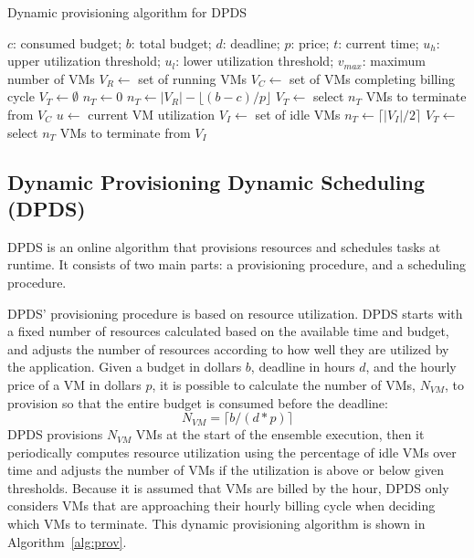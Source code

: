 \documentclass[preprint,5p]{elsarticle}
\begin{document}
\begin{algorithm}[tb]
\caption{Dynamic provisioning algorithm for DPDS}
\label{alg:prov}
{\footnotesize
\begin{algorithmic}[1]
\Require $c$: consumed budget; $b$: total budget; $d$: deadline; $p$: price;
$t$: current time; $u_h$: upper utilization threshold; $u_l$: lower utilization
threshold; $v_{max}$: maximum number of VMs
  \State $V_R\gets$ set of running VMs
    \State $V_C\gets$ set of VMs completing billing cycle
    \State $V_T\gets \emptyset$ 
    \State $n_T\gets 0$ 
      \State $n_T\gets |V_R| - \lfloor(b-c)/p\rfloor$
      \State $V_T\gets$ select $n_T$ VMs to terminate from $V_C$
      \State {} \label{l:terminate1}
    \Else 
    \State $u\gets$ current VM utilization
        \State {}
        \State $V_I\gets$ set of idle VMs
        \State $n_T\gets \lceil|V_I|/2\rceil$ \label{l:nT2}
      \State $V_T\gets$ select $n_T$ VMs to terminate from $V_I$
        \State {} \label{l:terminate2}
      \EndIf 
    \EndIf
\EndProcedure
\end{algorithmic}}
\end{algorithm}

\subsection{Dynamic Provisioning Dynamic Scheduling (DPDS)}
\label{sec:dpds}

DPDS is an online algorithm that provisions resources and schedules tasks at
runtime. It consists of two main parts: a provisioning procedure, and a
scheduling procedure.

DPDS' provisioning procedure is based on resource utilization. DPDS starts with
a fixed number of resources calculated based on the available time and budget,
and adjusts the number of resources according to how well they are utilized by
the application.
Given a budget in dollars $b$, deadline in hours $d$, and the hourly price of a
VM in dollars $p$, it is possible to calculate the number of VMs, $N_{VM}$, to
provision so that the entire budget is consumed before the deadline:
%
\begin{equation}
\label{eq:static-plan}
N_{VM} = \lceil b / (d * p) \rceil
\end{equation}
%
DPDS provisions $N_{VM}$ VMs at the start of the ensemble execution, then it
periodically computes resource utilization using the percentage of idle VMs
over time and adjusts the number of VMs if the utilization is above or below
given thresholds. Because it is assumed that VMs are billed by the hour, DPDS
only considers VMs that are approaching their hourly billing cycle when
deciding which VMs to terminate. This dynamic provisioning algorithm is shown
in Algorithm~\ref{alg:prov}.
\end{document}
